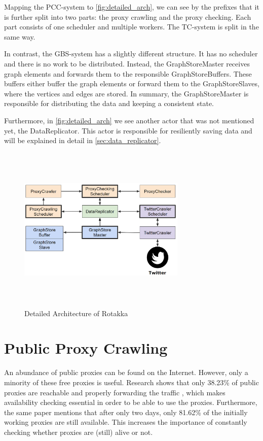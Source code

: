 \documentclass{sigchi}
\begin{document}
Mapping the PCC-system to \autoref{fig:detailed_arch}, we can see by the prefixes that it is further split into two parts: the proxy crawling and the proxy checking. 
Each part consists of one scheduler and multiple workers. The TC-system is split in the same way. 

In contrast, the GBS-system has a slightly different structure. It has no scheduler and there is no work to be distributed. 
Instead, the GraphStoreMaster receives graph elements and forwards them to the responsible GraphStoreBuffers. These buffers either buffer the graph elements or forward them to the GraphStoreSlaves, where the vertices and edges are stored. In summary, the GraphStoreMaster is responsible for distributing the data and keeping a consistent state.

Furthermore, in \autoref{fig:detailed_arch} we see another actor that was not mentioned yet, the DataReplicator. This actor is responsible for resiliently saving data and will be explained in detail in \autoref{sec:data_replicator}.

\begin{figure}[h]
\centering
\includegraphics[width=8cm,height=8cm,keepaspectratio]{figures/detailed_architecture.PNG}
\caption{Detailed Architecture of Rotakka}
\label{fig:detailed_arch}
\end{figure}


\section{Public Proxy Crawling}

An abundance of public proxies can be found on the Internet. However, only a minority of these free proxies is useful. Research shows that only 38.23\% of public proxies are reachable and properly forwarding the traffic \cite{fast_dist_crawling}, which makes availability checking essential in order to be able to use the proxies. Furthermore, the same paper mentions that after only two days, only 81.62\% of the initially working proxies are still available. This increases the importance of constantly checking whether proxies are (still) alive or not.
\end{document}
